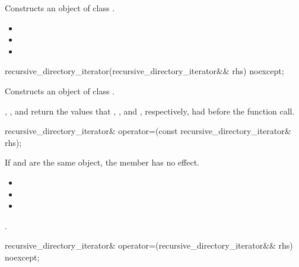 \begin{itemdescr}
\pnum
\effects Constructs an object of class .

\pnum
\postconditions
\begin{itemize}
\item {}
\item {}
\item {}
\end{itemize}
\end{itemdescr}

\begin{itemdecl}
recursive_directory_iterator(recursive_directory_iterator&& rhs) noexcept;
\end{itemdecl}

\begin{itemdescr}
\pnum
\effects Constructs an object of class .

\pnum
\postconditions {}, ,
  and  return the values that
  , , and
  , respectively, had before the function call.
\end{itemdescr}

\begin{itemdecl}
recursive_directory_iterator& operator=(const recursive_directory_iterator& rhs);
\end{itemdecl}

\begin{itemdescr}
\pnum
\effects If  and  are the same
  object, the member has no effect.

\pnum
\postconditions
\begin{itemize}
\item {}
\item {}
\item {}
\end{itemize}

\pnum
\returns {}.
\end{itemdescr}

\begin{itemdecl}
recursive_directory_iterator& operator=(recursive_directory_iterator&& rhs) noexcept;
\end{itemdecl}

